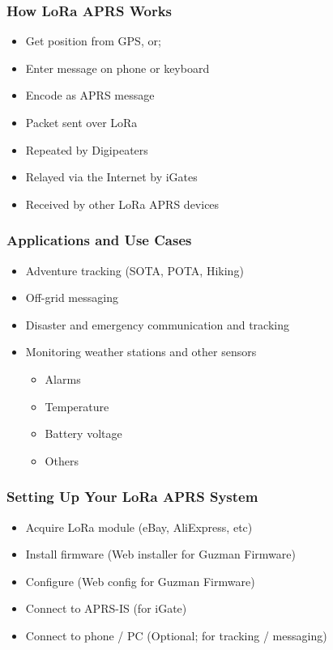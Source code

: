 \documentclass[aspectratio=169]{beamer}
\begin{document}
\begin{frame}[t]
  \frametitle{How LoRa APRS Works}
  \begin{itemize}
    \item Get position from GPS, or;
    \medskip
    \item Enter message on phone or keyboard
    \medskip
    \item Encode as APRS message
    \medskip
    \item Packet sent over LoRa
    \medskip
    \item Repeated by Digipeaters
    \medskip
    \item Relayed via the Internet by iGates
    \medskip
    \item Received by other LoRa APRS devices
  \end{itemize}
\end{frame}

\begin{frame}[t]
  \frametitle{Applications and Use Cases}
  \begin{itemize}
    \item Adventure tracking (SOTA, POTA, Hiking)
    \medskip
    \item Off-grid messaging
    \medskip
    \item Disaster and emergency communication and tracking
    \medskip
    \item Monitoring weather stations and other sensors
    \medskip
    \begin{itemize}
      \item Alarms
      \medskip
      \item Temperature
      \medskip
      \item Battery voltage
      \medskip
      \item Others
    \end{itemize}
  \end{itemize}
\end{frame}

\begin{frame}[t]
  \frametitle{Setting Up Your LoRa APRS System}
  \begin{itemize}
    \item Acquire LoRa module (eBay, AliExpress, etc)
    \medskip
    \item Install firmware (Web installer for Guzman Firmware)
    \medskip
    \item Configure (Web config for Guzman Firmware)
    \medskip
    \item Connect to APRS-IS (for iGate)
    \medskip
    \item Connect to phone / PC (Optional; for tracking / messaging)
  \end{itemize}
\end{frame}
\end{document}
